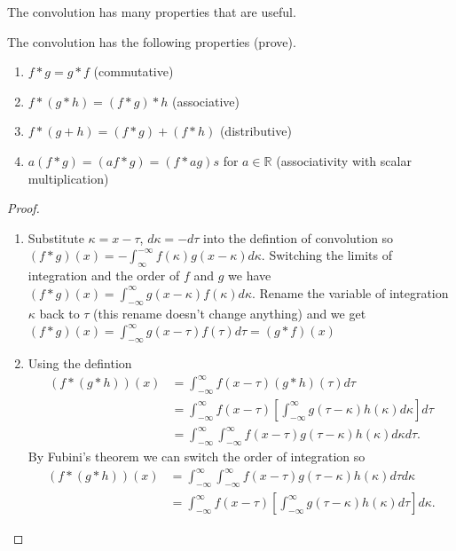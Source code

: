 	The convolution has many properties that are useful. 
	\begin{prop}
		The convolution has the following properties (prove).
		\begin{enumerate}
		\item $f*g=g*f$ (commutative)
		\item $f*(g*h)=(f*g)*h$ (associative)
		\item $f*(g+h)=(f*g)+(f*h)$ (distributive)
		\item $a(f*g)=(af*g)=(f*ag)s$ for $a\in\mathbb{R}$ (associativity with scalar multiplication)
		\end{enumerate}
	\end{prop}
	\begin{proof}\hspace{10mm}
		\begin{enumerate}
		\item Substitute $\kappa=x-\tau$, $d\kappa=-d\tau$ into the defintion of convolution so \mbox{$(f*g)(x)=-\int_{\infty}^{-\infty}f(\kappa)g(x-\kappa)d\kappa$}. Switching the limits of integration and the order of $f$ and $g$ we have \mbox{$(f*g)(x)=\int_{-\infty}^\infty g(x-\kappa)f(\kappa)d\kappa$}. Rename the variable of integration $\kappa$ back to $\tau$ (this rename doesn't change anything) and we get \mbox{$(f*g)(x)=\int_{-\infty}^\infty g(x-\tau)f(\tau)d\tau=(g*f)(x)$}
		\item Using the defintion
			\begin{equation*}\begin{array}{rl}
				(f*(g*h))(x)&=\int_{-\infty}^\infty f(x-\tau)(g*h)(\tau)d\tau\\
				&=\int_{-\infty}^\infty f(x-\tau)\left[ \int_{-\infty}^\infty g(\tau-\kappa)h(\kappa)d\kappa\right]d\tau\\
				&=\int_{-\infty}^\infty\int_{-\infty}^\infty f(x-\tau)g(\tau-\kappa)h(\kappa)d\kappa d\tau.
			\end{array}\end{equation*}
			By Fubini's theorem we can switch the order of integration so
			\begin{equation*}\begin{array}{rl}
				(f*(g*h))(x)&=\int_{-\infty}^\infty\int_{-\infty}^\infty f(x-\tau)g(\tau-\kappa)h(\kappa)d\tau d\kappa\\
				&=\int_{-\infty}^\infty f(x-\tau)\left[\int_{-\infty}^\infty g(\tau-\kappa)h(\kappa)d\tau\right]d\kappa.
			\end{array}\end{equation*}

\end{enumerate}
\end{proof}
